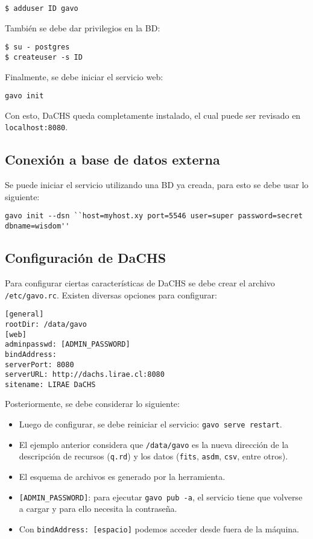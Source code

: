 \begin{verbatim}
$ adduser ID gavo
\end{verbatim}

Tambi\'en se debe dar privilegios en la BD:

\begin{verbatim}
$ su - postgres
$ createuser -s ID
\end{verbatim}

Finalmente, se debe iniciar el servicio web:

\begin{verbatim}
gavo init
\end{verbatim}

Con esto, DaCHS queda completamente instalado, el cual puede ser revisado en \verb;localhost:8080;.

\subsection*{Conexión a base de datos externa}

Se puede iniciar el servicio utilizando una BD ya creada, para esto se debe usar lo siguiente:

\begin{verbatim}
gavo init --dsn ``host=myhost.xy port=5546 user=super password=secret dbname=wisdom''
\end{verbatim}

\subsection*{Configuración de DaCHS}

Para configurar ciertas características de DaCHS se debe crear el archivo \verb;/etc/gavo.rc;. Existen diversas opciones para configurar:

\begin{verbatim}
[general]
rootDir: /data/gavo
[web]
adminpasswd: [ADMIN_PASSWORD]
bindAddress: 
serverPort: 8080
serverURL: http://dachs.lirae.cl:8080
sitename: LIRAE DaCHS
\end{verbatim}

Posteriormente, se debe considerar lo siguiente:

\begin{itemize}
	\item Luego de configurar, se debe reiniciar el servicio: \verb;gavo serve restart;.
	\item El ejemplo anterior considera que \verb;/data/gavo; es la nueva dirección de la descripción de recursos (\verb;q.rd;) y los datos (\verb;fits;, \verb;asdm;, \verb;csv;, entre otros).
	\item El esquema de archivos es generado por la herramienta.
	\item \verb;[ADMIN_PASSWORD];: para ejecutar \verb;gavo pub -a;, el servicio tiene que volverse a cargar y para ello necesita la contraseña.
	\item Con \verb;bindAddress: [espacio]; podemos acceder desde fuera de la máquina.
\end{itemize}


